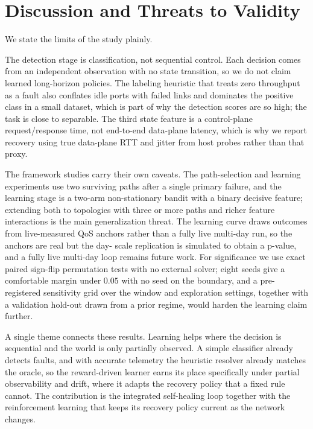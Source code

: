 \documentclass[conference]{IEEEtran}
\begin{document}
\section{Discussion and Threats to Validity}
\label{sec:threats}
We state the limits of the study plainly.

The detection stage is classification, not sequential control. Each decision comes
from an independent observation with no state transition, so we do not claim learned
long-horizon policies. The labeling heuristic that treats zero throughput as a fault
also conflates idle ports with failed links and dominates the positive class in a
small dataset, which is part of why the detection scores are so high; the task is
close to separable. The third state feature is a control-plane request/response time,
not end-to-end data-plane latency, which is why we report recovery using true
data-plane RTT and jitter from host probes rather than that proxy.

The framework studies carry their own caveats. The path-selection and learning
experiments use two surviving paths after a single primary failure, and the learning
stage is a two-arm non-stationary bandit with a binary decisive feature; extending
both to topologies with three or more paths and richer feature interactions is the
main generalization threat. The learning curve draws outcomes from live-measured QoS
anchors rather than a fully live multi-day run, so the anchors are real but the day-
scale replication is simulated to obtain a p-value, and a fully live multi-day loop
remains future work. For significance we use exact paired sign-flip permutation
tests with no external solver; eight seeds give a comfortable margin under $0.05$ with
no seed on the boundary, and a pre-registered sensitivity grid over the window and
exploration settings, together with a validation hold-out drawn from a prior regime,
would harden the learning claim further.

A single theme connects these results. Learning helps where the decision is
sequential and the world is only partially observed. A simple classifier already
detects faults, and with accurate telemetry the heuristic resolver already
matches the oracle, so the reward-driven learner earns its place specifically under
partial observability and drift, where it adapts the recovery policy that a fixed rule
cannot. The contribution is the integrated self-healing loop together with the
reinforcement learning that keeps its recovery policy current as the network changes.
\end{document}
